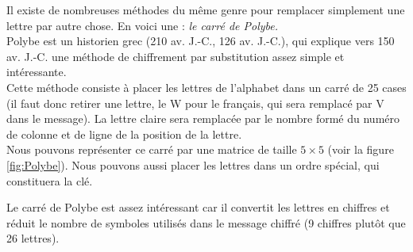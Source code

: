 Il existe de nombreuses méthodes du même genre pour remplacer
simplement une lettre par autre chose. En voici une :
\emph{le carré de Polybe.}\\

\label{syst:CarrePolybe}
Polybe est un historien grec (210 av. J.-C., 126 av. J.-C.), qui
explique vers 150 av. J.-C. une méthode de chiffrement par
substitution assez simple et intéressante.\\

Cette méthode consiste à placer les lettres de l'alphabet dans un
carré de 25 cases (il faut donc retirer une lettre, le W pour le
français, qui sera remplacé par V dans le message). La lettre
claire
sera remplacée par le nombre formé du numéro de colonne et de
ligne de la position de la lettre.\\

Nous pouvons représenter ce carré par une matrice de taille $5\times 5$
(voir la figure \ref{fig:Polybe}). Nous pouvons aussi placer les
lettres dans un ordre spécial, qui constituera la clé.

Le carré de Polybe est assez intéressant car il convertit les lettres
en chiffres et réduit le nombre de symboles utilisés dans le message
chiffré (9 chiffres plutôt que 26 lettres). \\

